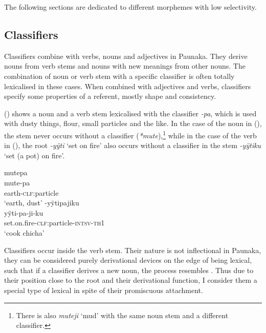 The following sections are dedicated to different morphemes with low selectivity.


\subsection{Classifiers}\label{sec:AffClCLF}

Classifiers combine with verbs, nouns and adjectives in Paunaka. They derive nouns from verb stems and nouns with new meanings from other nouns. The combination of noun or verb stem with a specific classifier is often totally lexicalised in these cases. When combined with adjectives and verbs, classifiers specify some properties of a referent, mostly shape and consistency. 

() shows a noun and a verb stem lexicalised with the classifier \textit{-pa}, which is used with dusty things, flour, small particles and the like. In the case of the noun in (), the stem never occurs without a classifier (\textit{*mute}),\footnote{There is also \textit{muteji} ‘mud’ with the same noun stem and a different classifier.} while in the case of the verb in (), the root \textit{-yÿti} ‘set on fire’ also occurs without a classifier in the stem \textit{-yÿtiku} ‘set (a pot) on fire’.

\ea\label{ex:FirstCLF-1}
  \ea\label{ex:FirstCLF-1.1}
\begingl
\glpreamble mutepa\\
\gla mute-pa\\
\glb earth-\textsc{clf:}particle\\
\glft ‘earth, dust’
\endgl
  \ex\label{ex:FirstCLF-1.2}
\begingl
\glpreamble -yÿtipajiku\\
\gla yÿti-pa-ji-ku\\
\glb set.on.fire-\textsc{clf:}particle-\textsc{intsv}-\textsc{th}1\\
\glft ‘cook chicha’
\endgl
\z
\xe

Classifiers occur inside the verb stem. Their nature is not inflectional in Paunaka, they can be considered purely derivational devices on the edge of being lexical, such that if a classifier derives a new noun, the process resembles . Thus due to their position close to the root and their derivational function, I consider them a special type of lexical  in spite of their promiscuous attachment.

